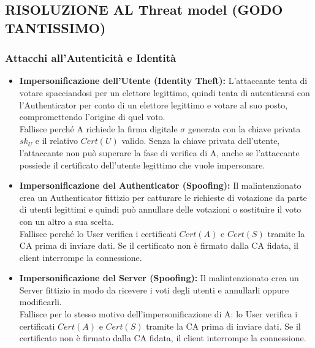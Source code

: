 \subsection{RISOLUZIONE AL Threat model (GODO TANTISSIMO)}

\subsubsection{Attacchi all'Autenticità e Identità}
\begin{itemize}
	\item \textbf{Impersonificazione dell'Utente (Identity Theft):}  L'attaccante tenta di votare spacciandosi per un elettore legittimo, quindi tenta di autenticarsi con l'Authenticator per conto di un elettore legittimo e votare al suo posto, compromettendo l'origine di quel voto. \\
	Fallisce perché A richiede la firma digitale $\sigma$ generata con la chiave privata $sk_U$ e il relativo $Cert(U)$ valido. Senza la chiave privata dell'utente, l'attaccante non può superare la fase di verifica di A, anche se l'attaccante possiede il certificato dell'utente legittimo che vuole impersonare.
	
	\item \textbf{Impersonificazione del Authenticator (Spoofing):}
	Il malintenzionato crea un Authenticator fittizio per catturare le richieste di votazione da parte di utenti legittimi e quindi può annullare delle votazioni o sostituire il voto con un altro a sua scelta.\\
	Fallisce perché lo User verifica i certificati $Cert(A)$ e $Cert(S)$ tramite la CA prima di inviare dati. Se il certificato non è firmato dalla CA fidata, il client interrompe la connessione.
	
	\item \textbf{Impersonificazione del Server (Spoofing):}
	Il malintenzionato crea un Server fittizio in modo da ricevere i voti degli utenti e annullarli oppure modificarli.\\
	Fallisce per lo stesso motivo dell'impersonificazione di A: lo User verifica i certificati $Cert(A)$ e $Cert(S)$ tramite la CA prima di inviare dati. Se il certificato non è firmato dalla CA fidata, il client interrompe la connessione.
\end{itemize}

